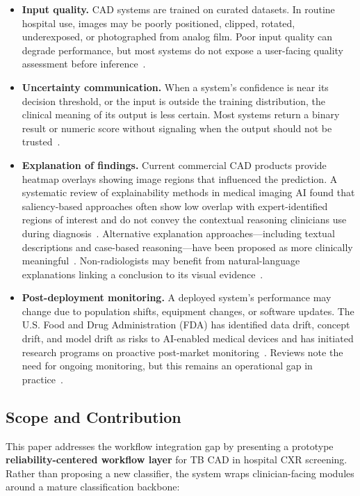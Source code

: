 \documentclass[conference, letterpaper]{IEEEtran}
\begin{document}
\begin{itemize}
    \item \textbf{Input quality.} CAD systems are trained on curated datasets. In routine hospital use, images may be poorly positioned, clipped, rotated, underexposed, or photographed from analog film. Poor input quality can degrade performance, but most systems do not expose a user-facing quality assessment before inference~\cite{mongan2023review, degrave2021shortcut}.
    \item \textbf{Uncertainty communication.} When a system's confidence is near its decision threshold, or the input is outside the training distribution, the clinical meaning of its output is less certain. Most systems return a binary result or numeric score without signaling when the output should not be trusted~\cite{kompa2021uncertainty}.
    \item \textbf{Explanation of findings.} Current commercial CAD products provide heatmap overlays showing image regions that influenced the prediction. A systematic review of explainability methods in medical imaging AI found that saliency-based approaches often show low overlap with expert-identified regions of interest and do not convey the contextual reasoning clinicians use during diagnosis~\cite{chen2022xai_human_centered}. Alternative explanation approaches---including textual descriptions and case-based reasoning---have been proposed as more clinically meaningful~\cite{borys2023xai_beyond_saliency}. Non-radiologists may benefit from natural-language explanations linking a conclusion to its visual evidence~\cite{siemens_llm_cxr_2023}.
    \item \textbf{Post-deployment monitoring.} A deployed system's performance may change due to population shifts, equipment changes, or software updates. The U.S. Food and Drug Administration (FDA) has identified data drift, concept drift, and model drift as risks to AI-enabled medical devices and has initiated research programs on proactive post-market monitoring~\cite{fda_postmarket}. Reviews note the need for ongoing monitoring, but this remains an operational gap in practice~\cite{mongan2023review}.
\end{itemize}

\subsection{Scope and Contribution}

This paper addresses the workflow integration gap by presenting a prototype \textbf{reliability-centered workflow layer} for TB CAD in hospital CXR screening. Rather than proposing a new classifier, the system wraps clinician-facing modules around a mature classification backbone:
\end{document}
